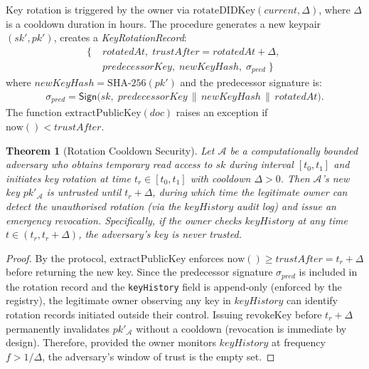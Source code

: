 \documentclass[conference]{IEEEtran}
\newtheorem{theorem}{Theorem}
\newcommand{\Adv}{\mathcal{A}}
\newcommand{\Sign}{\mathsf{Sign}}
\begin{document}
Key rotation is triggered by the owner via
$\mathrm{rotateDIDKey}(\mathit{current}, \Delta)$, where
$\Delta$ is a cooldown duration in hours. The procedure generates
a new keypair $(\mathit{sk}', pk')$, creates a
\textit{KeyRotationRecord}:
{\small\begin{align*}
\bigl\{\;
  &\mathit{rotatedAt},\;
  \mathit{trustAfter} = \mathit{rotatedAt} + \Delta,\;\\
  &\mathit{predecessorKey},\;
  \mathit{newKeyHash},\;
  \sigma_{\mathit{pred}}
\;\bigr\}
\end{align*}}
where $\mathit{newKeyHash} = \mathrm{SHA}\text{-}256(pk')$ and
the predecessor signature is:
{\small\begin{align*}
  \sigma_{\mathit{pred}} = \Sign\bigl(\mathit{sk},\;
    \mathit{predecessorKey} \,\|\,
    \mathit{newKeyHash} \,\|\,
    \mathit{rotatedAt}\bigr).
\end{align*}}
The function $\mathrm{extractPublicKey}(\mathit{doc})$ raises an
exception if $\mathrm{now}() < \mathit{trustAfter}$.

\begin{theorem}[Rotation Cooldown Security]
\label{thm:rotation}
Let $\Adv$ be a computationally bounded adversary who obtains
temporary read access to $\mathit{sk}$ during interval
$[t_0, t_1]$ and initiates key rotation at time $t_r \in
[t_0, t_1]$ with cooldown $\Delta > 0$. Then $\Adv$'s new key
$pk'_{\Adv}$ is untrusted until $t_r + \Delta$, during which
time the legitimate owner can detect the unauthorised rotation
(via the $\mathit{keyHistory}$ audit log) and issue an
emergency revocation. Specifically, if the owner checks
$\mathit{keyHistory}$ at any time $t \in (t_r, t_r + \Delta)$,
the adversary's key is never trusted.
\end{theorem}
\begin{proof}
By the protocol, $\mathrm{extractPublicKey}$ enforces
$\mathrm{now}() \geq \mathit{trustAfter} = t_r + \Delta$ before
returning the new key. Since the predecessor signature
$\sigma_{\mathit{pred}}$ is included in the rotation record and
the \texttt{keyHistory} field is append-only (enforced by the
registry), the legitimate owner observing any key in
$\mathit{keyHistory}$ can identify rotation records initiated
outside their control. Issuing $\mathrm{revokeKey}$ before
$t_r + \Delta$ permanently invalidates $pk'_{\Adv}$ without a
cooldown (revocation is immediate by design). Therefore, provided
the owner monitors $\mathit{keyHistory}$ at frequency
$f > 1/\Delta$, the adversary's window of trust is the empty set.
\end{proof}
\end{document}
